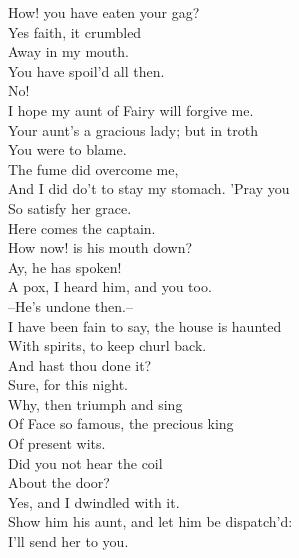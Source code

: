 \documentclass{memoir}
\begin{document}
\begin{drama*}
\subtlespeaks  How! you have eaten your gag?\\
\dapperspeaks {} Yes faith, it crumbled\\
 Away in my mouth.\\
\subtlespeaks {} You have spoil'd all then.\\
\dapperspeaks  No!\\
 I hope my aunt of Fairy will forgive me.\\
\subtlespeaks  Your aunt's a gracious lady; but in troth\\
 You were to blame.\\
\dapperspeaks {} The fume did overcome me,\\
 And I did do't to stay my stomach. 'Pray you\\
 So satisfy her grace.\\
 Here comes the captain.\\
\facespeaks {} How now! is his mouth down?\\
\subtlespeaks  Ay, he has spoken!\\
\facespeaks {} A pox, I heard him, and you too.\\
 --He's undone then.--\\
 I have been fain to say, the house is haunted\\
 With spirits, to keep churl back.\\
\subtlespeaks {} And hast thou done it?\\
\facespeaks  Sure, for this night.\\
\subtlespeaks {} Why, then triumph and sing\\
 Of Face so famous, the precious king\\
 Of present wits.\\
\facespeaks {} Did you not hear the coil\\
 About the door?\\
\subtlespeaks {} Yes, and I dwindled with it.\\
\facespeaks  Show him his aunt, and let him be dispatch'd:\\
 I'll send her to you.\\

\end{drama*}
\end{document}
